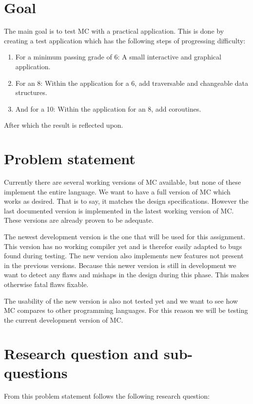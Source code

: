 \section{Goal}\label{sec:goalsmandate}
The main goal is to test MC with a practical application.
This is done by creating a test application which has the following steps of progressing difficulty:

\begin{enumerate}
   \item For a minimum passing grade of 6: \newline
      A small interactive and graphical application.
   \item For an 8: \newline
      Within the application for a 6, add traversable and changeable data structures.
   \item And for a 10: \newline
      Within the application for an 8, add coroutines.
\end{enumerate}

After which the result is reflected upon.

\section{Problem statement}
Currently there are several working versions of MC available, but none of these implement the entire language.
We want to have a full version of MC which works as desired.
That is to say, it matches the design specifications.
However the last documented version is implemented in the latest working version of MC.
These versions are already proven to be adequate\cite{giuseppe2015mc}.

The newest development version is the one that will be used for this assignment.
This version has no working compiler yet and is therefor easily adapted to bugs found during testing.
The new version also implements new features not present in the previous versions.
Because this newer version is still in development we want to detect any flaws and mishaps in the design during this phase.
This makes otherwise fatal flaws fixable.

The usability of the new version is also not tested yet and we want to see how MC compares to other programming languages.
For this reason we will be testing the current development version of MC.

\section{Research question and sub-questions}
From this problem statement follows the following research question:

